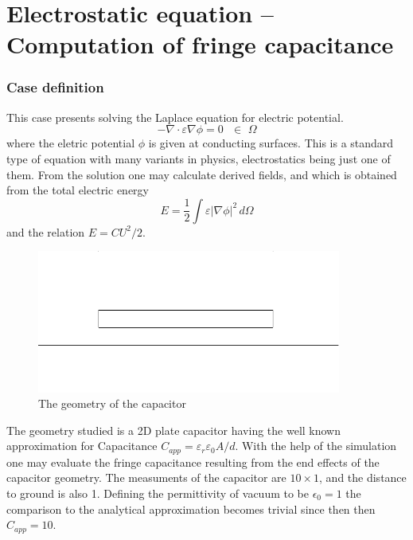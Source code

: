 \chapter{Electrostatic equation -- Computation of fringe capacitance}



\subsection*{Case definition}

This case presents solving the Laplace equation for electric potential.
\begin{equation}
  - \nabla \cdot \varepsilon \nabla \phi = 0  \, \, \, \, \in \, \, \Omega
\end{equation}
where the eletric potential $\phi$ is given at conducting surfaces.
This is a standard type of equation with many variants in physics, electrostatics being just one of them.
From the solution one may calculate 
derived fields, and 
which is obtained from the total electric energy 
\begin{equation}
  E=\frac{1}{2} \int \varepsilon | \nabla \phi |^2 \, d\Omega
\end{equation}
and the relation $E=CU^2/2$.

\begin{figure}[h]
\centering
\includegraphics[width=10cm, viewport=0 20 640 280,clip]{capacitor}
\caption{The geometry of the capacitor}\label{fg:es_capacitor}
\end{figure} 

The geometry studied 
is a 2D plate capacitor having the well known approximation
for Capacitance $C_{app}=\varepsilon_r\varepsilon_0 A/d$.
With the help of the
simulation one may evaluate the fringe capacitance resulting
from the end effects of the capacitor geometry.
The measuments of the capacitor are $10 \times 1$, and the distance to
ground is also 1. Defining the permittivity of vacuum to be 
$\epsilon_0 = 1$ the comparison to the analytical approximation
becomes trivial since then then $C_{app} = 10$. 

